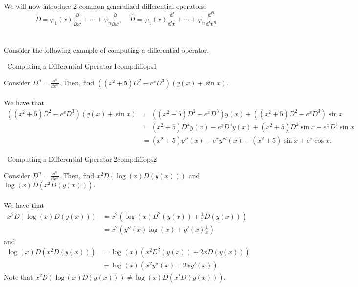         \vphantom
        \\
        \\
        We will now introduce \(2\) common generalized differential operators:
        \begin{equation*}
            \tilde{D}=\varphi_1(x)\frac{\dd}{\dd x}+\cdots+\varphi_n\frac{\dd}{\dd x},\quad \hat{D}=\varphi_1(x)\frac{\dd}{\dd x}+\cdots+\varphi_n\frac{\dd^n}{\dd x^n}.
        \end{equation*}
        \pagebreak
        \vphantom
        \\
        \\
        Consider the following example of computing a differential operator.
        \begin{example}{\Difficulty\,\Difficulty\,\,Computing a Differential Operator 1}{compdiffops1}

            Consider \(D^n=\frac{\dd^n}{\dd x^n}\). Then, find \(((x^2+5)D^2-e^xD^3)(y(x)+\sin x)\).
            \\
            \\
            We have that
            \begin{align*}
                ((x^2+5)D^2-e^xD^3)(y(x)+\sin x)&=((x^2+5)D^2-e^xD^3)y(x)+((x^2+5)D^2-e^xD^3)\sin x \\
                &=(x^2+5)D^2y(x)-e^xD^3y(x)+(x^2+5)D^2\sin x-e^xD^3\sin x \\
                &=(x^2+5)y''(x)-e^xy'''(x)-(x^2+5)\sin x+e^x\cos x.
            \end{align*}

        \end{example}
        \begin{example}{\Difficulty\,\Difficulty\,\,Computing a Differential Operator 2}{compdiffops2}

            Consider \(D^n=\frac{\dd^n}{\dd x^n}\). Then, find \(x^2D(\log(x) D(y(x)))\) and \(\log(x) D(x^2D(y(x)))\).
            \\
            \\
            We have that
            \begin{align*}
                x^2D(\log(x) D(y(x)))&=x^2\left(\log(x) D^2(y(x))+\frac{1}{x}D(y(x))\right) \\
                &=x^2\left(y''(x)\log(x) +y'(x)\frac{1}{x}\right)
            \end{align*}
            and
            \begin{align*}
                \log(x) D(x^2D(y(x)))&=\log(x)\left(x^2D^2(y(x))+2xD(y(x))\right) \\
                &=\log(x)\left(x^2y''(x)+2xy'(x)\right).
            \end{align*}
            Note that \(x^2D(\log(x) D(y(x)))\neq \log(x) D(x^2D(y(x)))\).

        \end{example}
